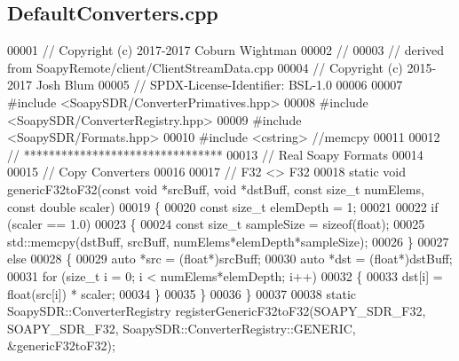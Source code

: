 \subsection{Default\+Converters.\+cpp}
\label{DefaultConverters_8cpp_source}

\begin{DoxyCode}
00001 \textcolor{comment}{// Copyright (c) 2017-2017 Coburn Wightman}
00002 \textcolor{comment}{//}
00003 \textcolor{comment}{// derived from SoapyRemote/client/ClientStreamData.cpp}
00004 \textcolor{comment}{// Copyright (c) 2015-2017 Josh Blum}
00005 \textcolor{comment}{// SPDX-License-Identifier: BSL-1.0}
00006 
00007 \textcolor{preprocessor}{#include <SoapySDR/ConverterPrimatives.hpp>}
00008 \textcolor{preprocessor}{#include <SoapySDR/ConverterRegistry.hpp>}
00009 \textcolor{preprocessor}{#include <SoapySDR/Formats.hpp>}
00010 \textcolor{preprocessor}{#include <cstring>} \textcolor{comment}{//memcpy}
00011 
00012 \textcolor{comment}{// ********************************}
00013 \textcolor{comment}{// Real Soapy Formats}
00014 
00015 \textcolor{comment}{// Copy Converters}
00016 
00017 \textcolor{comment}{// F32 <> F32}
00018 \textcolor{keyword}{static} \textcolor{keywordtype}{void} genericF32toF32(\textcolor{keyword}{const} \textcolor{keywordtype}{void} *srcBuff, \textcolor{keywordtype}{void} *dstBuff, \textcolor{keyword}{const} \textcolor{keywordtype}{size\_t} numElems, \textcolor{keyword}{const} \textcolor{keywordtype}{double} scaler)
00019 \{
00020   \textcolor{keyword}{const} \textcolor{keywordtype}{size\_t} elemDepth = 1;
00021 
00022   \textcolor{keywordflow}{if} (scaler == 1.0)
00023     \{
00024       \textcolor{keyword}{const} \textcolor{keywordtype}{size\_t} sampleSize = \textcolor{keyword}{sizeof}(float);
00025       std::memcpy(dstBuff, srcBuff, numElems*elemDepth*sampleSize);
00026     \}
00027   \textcolor{keywordflow}{else}
00028     \{
00029       \textcolor{keyword}{auto} *src = (\textcolor{keywordtype}{float}*)srcBuff;
00030       \textcolor{keyword}{auto} *dst = (\textcolor{keywordtype}{float}*)dstBuff;
00031       \textcolor{keywordflow}{for} (\textcolor{keywordtype}{size\_t} i = 0; i < numElems*elemDepth; i++)
00032     \{
00033       dst[i] = float(src[i]) * scaler;
00034     \}
00035     \}
00036 \}
00037 
00038 \textcolor{keyword}{static} SoapySDR::ConverterRegistry registerGenericF32toF32(SOAPY_SDR_F32, 
      SOAPY_SDR_F32, SoapySDR::ConverterRegistry::GENERIC, &genericF32toF32);

\end{DoxyCode}
